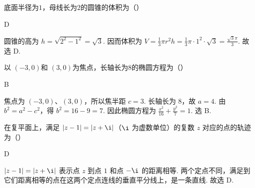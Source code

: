 \begin{problem}
底面半径为\(1\)，母线长为\(2\)的圆锥的体积为（\quad）


\begin{answer}
D
\end{answer}

\begin{solution}
圆锥的高为 \(h=\sqrt{2^2-1^2}=\sqrt3\). 因而体积为 \(V=\frac13\pi r^2h=\frac13\pi\cdot1^2\cdot\sqrt3=\frac{\sqrt3\pi}{3}\). 故选 D.
\end{solution}
\end{problem}

\begin{problem}
以 \( (-3,0) \)和 \( (3,0) \)为焦点，长轴长为8的椭圆方程为（\quad）


\begin{answer}
B
\end{answer}

\begin{solution}
焦点为 \((-3,0)\)、\((3,0)\)，所以焦半距 \(c=3\). 长轴长为 \(8\)，故 \(a=4\). 由 \(b^2=a^2-c^2\)，得 \(b^2=16-9=7\). 因此椭圆方程为 \(\frac{x^2}{16}+\frac{y^2}{7}=1\). 选 B.
\end{solution}
\end{problem}

\begin{problem}
在复平面上，满足 \( |z-1|=|z+\i| \)（\(\i\) 为虚数单位）的复数 \(z\) 对应的点的轨迹为（\quad）


\begin{answer}
D
\end{answer}

\begin{solution}
\(|z-1|=|z+\i|\) 表示点 \(z\) 到点 \(1\) 和点 \(-\i\) 的距离相等. 两个定点不同，满足到它们距离相等的点在这两个定点连线的垂直平分线上，是一条直线. 故选 D.
\end{solution}
\end{problem}

